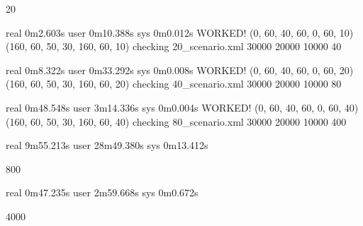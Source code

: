 20

real	0m2.603s
user	0m10.388s
sys	0m0.012s
WORKED! (0, 60, 40, 60, 0, 60, 10) (160, 60, 50, 30, 160, 60, 10) checking 20_scenario.xml 30000 20000 10000
40

real	0m8.322s
user	0m33.292s
sys	0m0.008s
WORKED! (0, 60, 40, 60, 0, 60, 20) (160, 60, 50, 30, 160, 60, 20) checking 40_scenario.xml 30000 20000 10000
80

real	0m48.548s
user	3m14.336s
sys	0m0.004s
WORKED! (0, 60, 40, 60, 0, 60, 40) (160, 60, 50, 30, 160, 60, 40) checking 80_scenario.xml 30000 20000 10000
400

real	9m55.213s
user	28m49.380s
sys	0m13.412s

800

real	0m47.235s
user	2m59.668s
sys	0m0.672s

4000
